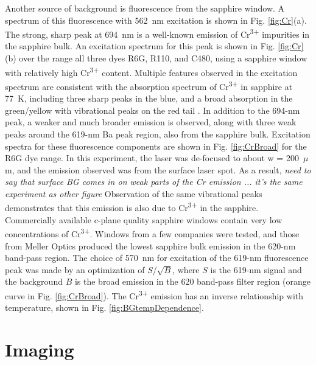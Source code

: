Another source of background is fluorescence from the sapphire window.  A spectrum of this fluorescence with 562~nm excitation is shown in Fig. \ref{fig:Cr}(a).  The strong, sharp peak at 694~nm is a well-known emission of Cr\textsuperscript{3+} impurities in the sapphire bulk.  An excitation spectrum for this peak is shown in Fig. \ref{fig:Cr}(b) over the range all three dyes R6G, R110, and C480, using a sapphire window with relatively high Cr\textsuperscript{3+} content.  Multiple features observed in the excitation spectrum are consistent with the absorption spectrum of Cr\textsuperscript{3+} in sapphire at 77~K, including three sharp peaks in the blue, and a broad absorption in the green/yellow with vibrational peaks on the red tail \cite{SapphireFord,SapphireMcclure}.  In addition to the 694-nm peak, a weaker and much broader emission is observed, along with three weak peaks around the 619-nm Ba peak region, also from the sapphire bulk.  Excitation spectra for these fluorescence components are shown in Fig. \ref{fig:CrBroad} for the R6G dye range.  In this experiment, the laser was de-focused to about w = 200~$\mu$m, and the emission observed was from the surface laser spot.  As a result, \emph{\color{red}need to say that surface BG comes in on weak parts of the Cr emission ... it's the same experiment as other figure} Observation of the same vibrational peaks demonstrates that this emission is also due to Cr\textsuperscript{3+} in the sapphire.  Commercially available c-plane quality sapphire windows contain very low concentrations of Cr\textsuperscript{3+}.  Windows from a few companies were tested, and those from Meller Optics produced the lowest sapphire bulk emission in the 620-nm band-pass region.  The choice of 570~nm for excitation of the 619-nm fluorescence peak was made by an optimization of $S$/$\sqrt{B}$, where $S$ is the 619-nm signal and the background $B$ is the broad emission in the 620 band-pass filter region (orange curve in Fig. \ref{fig:CrBroad}).  The Cr\textsuperscript{3+} emission has an inverse relationship with temperature, shown in Fig. \ref{fig:BGtempDependence}.



\section{Imaging}
\label{imaging}

